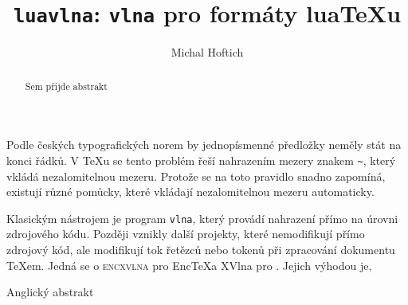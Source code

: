 \documentclass{csbulletin}
\begin{document}
\title{\texttt{luavlna}: \texttt{vlna} pro formáty lua\TeX u}
\author{Michal Hoftich}
\maketitle
\begin{abstract}
Sem přijde abstrakt
\end{abstract}

Podle českých typografických norem by jednopísmenné předložky neměly stát na 
konci řádků. V \TeX u se tento problém řeší nahrazením mezery znakem \verb|~|,
který vkládá nezalomitelnou mezeru. Protože se na toto pravidlo snadno zapomíná,
existují různé pomůcky, které vkládají nezalomitelnou mezeru automaticky.

Klasickým nástrojem je program \verb|vlna|, který provádí nahrazení přímo na
úrovni zdrojového kódu. Později vznikly další projekty, které nemodifikují přímo
zdrojový kód, ale modifikují tok řetězců nebo tokenů při zpracování dokumentu 
\TeX em. Jedná se o \textsc{encxvlna} pro Enc\TeX a X\raisebox{.3ex}{Ǝ}Vlna pro .
Jejich výhodou je, 
\begin{summary}
	Anglický abstrakt

\end{summary}
\end{document}
